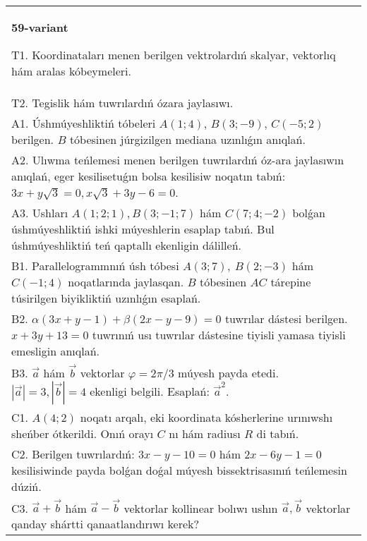 \documentclass{article}
\begin{document}
    
    \begin{tabular}{m{17cm}}
    \textbf{59-variant}
    \newline
    
    T1. 
    Koordinataları menen berilgen vektrolardıń skalyar, vektorlıq hám aralas kóbeymeleri. \\
    T2. 
    Tegislik hám tuwrılardıń ózara jaylasıwı.
     \\
    A1. 
    Úshmúyeshliktiń tóbeleri $A(1;4)$, $B(3;-9)$, $C(-5;2)$
    berilgen. $B$ tóbesinen júrgizilgen mediana uzınlıǵın anıqlań.
     \\
    A2. 
    Ulıwma teńlemesi menen berilgen tuwrılardıń
    óz-ara jaylasıwın anıqlań, eger kesilisetuǵın bolsa kesilisiw noqatın
    tabıń: $3x+y\sqrt{3}=0, x\sqrt{3}+3y-6=0$.
     \\
    A3. 
    Ushları $A (1;2;1), B (3;-1;7)$ hám $C(7;4;-2)$ bolǵan úshmúyeshliktiń
    ishki múyeshlerin esaplap tabıń. Bul úshmúyeshliktiń teń qaptallı ekenligin dálilleń. 
     \\
    B1. 
    Parallelogrammnıń úsh tóbesi \(A(3;7),\ B(2;-3)\) hám
    \(C(-1;4)\) noqatlarında jaylasqan. $B$ tóbesinen $AC$
    tárepine túsirilgen biyikliktiń uzınlıǵın esaplań.
     \\
    B2. 
    \(\alpha(3x+y-1)+\beta(2x-y-9)=0\) tuwrılar dástesi
    berilgen. \(x+3y+13=0\) tuwrınıń usı tuwrılar dástesine tiyisli
    yamasa tiyisli emesligin anıqlań.
     \\
    B3. 
    $\vec{a}$ hám $\vec{b}$ vektorlar $\varphi = 2\pi/3$ múyesh payda etedi. $|\vec{a}| = 3,|\vec{b}| = 4$ ekenligi belgili. Esaplań: 
    ${\vec{a}}^{2}$. 
     \\
    C1. \(A(4;2)\) noqatı arqalı, eki koordinata kósherlerine
    urınıwshı sheńber ótkerildi. Onıń orayı $C$ nı hám radiusı
    $R$ di tabıń.
     \\
    C2. 
    Berilgen tuwrılardıń: \(3x - y - 10 = 0\) hám
    \(2x - 6y - 1 = 0\) kesilisiwinde payda bolǵan doǵal múyesh
    bissektrisasınıń teńlemesin dúziń.
     \\
    C3. 
    \(\vec{a}+\vec{b}\) hám \(\vec{a} - \vec{b}\) vektorlar kollinear bolıwı ushın \(\vec{a},\vec{b}\) vektorlar qanday shártti qanaatlandırıwı kerek?
     \\
    
    \end{tabular}
    \vspace{1cm}
    
\end{document}
